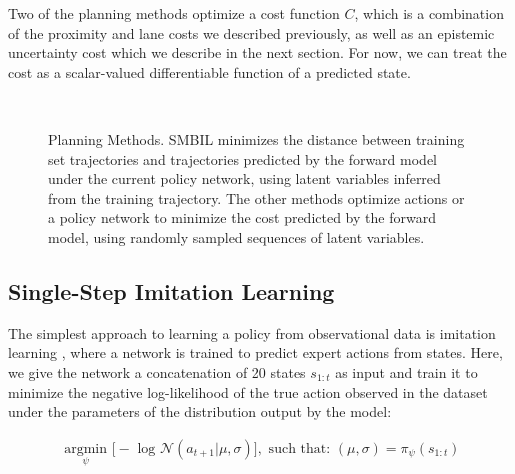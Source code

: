 \documentclass{article} %
\begin{document}
  Two of the planning methods optimize a cost function $C$, which is a combination of the proximity and lane costs we described previously, as well as an epistemic uncertainty cost which we describe in the next section. For now, we can treat the cost as a scalar-valued differentiable function of a predicted state.


\begin{figure}[ht!]
    \centering
     \\
    \label{planning-methods}
    \caption{Planning Methods. SMBIL minimizes the distance between training set trajectories and trajectories predicted by the forward model under the current policy network, using latent variables inferred from the training trajectory. The other methods optimize actions or a policy network to minimize the cost predicted by the forward model, using randomly sampled sequences of latent variables.}
\end{figure}



  \subsection{Single-Step Imitation Learning}


  The simplest approach to learning a policy from observational data is imitation learning \citep{Pomerleau91}, where a network is trained to predict expert actions from states. Here, we give the network a concatenation of 20 states $s_{1:t}$ as input and train it to minimize the negative log-likelihood of the true action observed in the dataset under the parameters of the distribution output by the model:

    \begin{align*}
    \underset{\psi}{\mbox{ argmin }} \Big[ -\mbox{ log } \mathcal{N}(a_{t+1} | \mu, \sigma) \Big],  \mbox{ such that: } (\mu, \sigma) = \pi_\psi(s_{1:t}) \\
  \end{align*}
\end{document}

